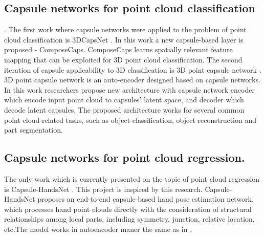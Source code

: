 \subsection{Capsule networks for point cloud classification}. The first work where capsule networks were applied to the problem of point cloud classification is 3DCapsNet \cite{cheraghian_3dcapsule_2018}. In this work a new capsule-based layer is proposed - ComposeCaps. ComposeCaps learns spatially relevant feature mapping that can be exploited for 3D point cloud classification.
The second iteration of capsule applicability to 3D classification is 3D point capsule network \cite{zhao_3d_2019}. 3D point capsule network is an auto-encoder designed based on capsule networks. In this work researchers propose new architecture with capsule network encoder which encode input point cloud to capsules' latent space, and decoder which decode latent capsules. The proposed architecture works for several common point cloud-related tasks, such as object classification, object reconstruction and part segmentation.

\subsection{Capsule networks for point cloud regression.} The only work which is currently presented on the topic of point cloud regression is Capsule-HandsNet \cite{wu_3d_2020}. This project is inspired by this research. Capsule-HandsNet proposes an end-to-end capsule-based hand pose estimation network, which processes hand point clouds directly with the consideration of structural relationships among local parts, including symmetry, junction, relative location, etc.The model works in autoencoder maner the same as in \cite{zhao_3d_2019}.
